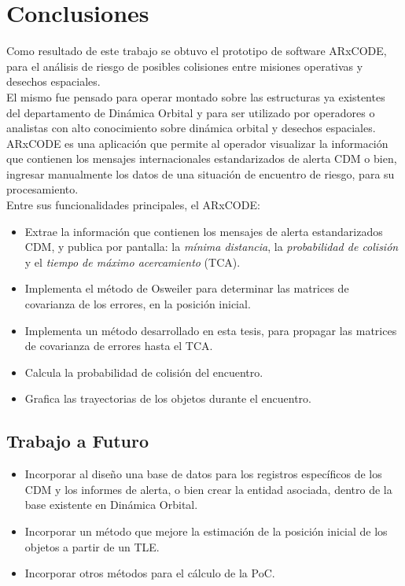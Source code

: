  \chapter{Conclusiones}
\label{chap:conclusiones}

Como resultado de este trabajo se obtuvo el prototipo de software ARxCODE, para el an\'alisis de riesgo de posibles colisiones entre misiones operativas y desechos espaciales.\\
El mismo fue pensado para operar montado sobre las estructuras ya existentes del departamento de Din\'amica Orbital y para ser utilizado por operadores o analistas con alto conocimiento sobre din\'amica orbital y desechos espaciales.\\

ARxCODE es una aplicaci\'on que permite al operador visualizar la informaci\'on que contienen los mensajes internacionales estandarizados de alerta \ac{CDM} o bien, ingresar manualmente los datos de una situaci\'on de encuentro de riesgo, para su procesamiento.\\

Entre sus funcionalidades principales, el ARxCODE:\\

\begin{itemize}
 \item Extrae la informaci\'on que contienen los mensajes de alerta estandarizados CDM, y publica por pantalla: la {\it{m\'inima distancia}}, la {\it{probabilidad de colisi\'on}} y el {\it{tiempo de m\'aximo acercamiento}} (TCA). 
 \item Implementa el m\'etodo de Osweiler \cite{osweiler} para determinar las matrices de covarianza de los errores, en la posici\'on inicial.
 \item Implementa un m\'etodo desarrollado en esta tesis, para propagar las matrices de covarianza de errores hasta el TCA.
 \item Calcula la probabilidad de colisi\'on del encuentro.
 \item Grafica las trayectorias de los objetos durante el encuentro.
\end{itemize}


\section*{Trabajo a Futuro}

\begin{itemize}
 \item Incorporar al dise\~no una base de datos para los registros espec\'ificos de los CDM y los informes de alerta, o bien 
 crear la entidad asociada, dentro de la base existente en Din\'amica Orbital.
 \item Incorporar un m\'etodo que mejore la estimaci\'on de la posici\'on inicial de los objetos a partir de un TLE.
 \item Incorporar otros m\'etodos para el c\'alculo de la PoC.
\end{itemize}


\endinput